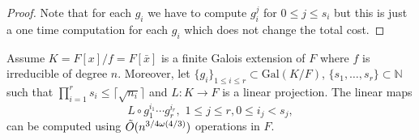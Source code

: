 \begin{proof}
%
%
%
%

Note that for each $g_i$ we have to compute $g_i^j$ for $0 \leq j \leq s_i$ but this is just a one time computation for each $g_i$
which does not change the total cost.
\end{proof}

\begin{lemma}\label{lem:transmodcomp}
Assume $K = F[x]/f = F[\bar{x}]$ is a finite Galois extension of $F$ where $f$ is irreducible of degree $n$. Moreover,
let $ \lbrace g_i \rbrace_{1\leq i \leq r} \subset \mathrm{Gal}(K/F) $, $\lbrace s_1, \ldots, s_r \rbrace \subset \mathbb{N}$
such that $\prod_{i = 1}^r s_i \leq \lceil \sqrt{n_i} \rceil$
 and $L: K\rightarrow F$ is a linear projection. The linear maps
$$L \circ g_1^{i_1} \cdots g_r^{i_r}, \,\, 1\leq j \leq r, 0 \leq i_j < s_j, $$ can be computed using $\tilde{O}(n^{3/4 \omega(4/3)})$ operations in $F$. 
\end{lemma} 

